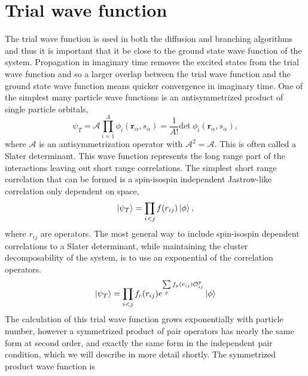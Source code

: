 \section{Trial wave function}
The trial wave function is used in both the diffusion and branching algorithms and thus it is important that it be close to the ground state wave function of the system. Propagation in imaginary time removes the excited states from the trial wave function and so a larger overlap between the trial wave function and the ground state wave function means quicker convergence in imaginary time. One of the simplest many particle wave functions is an antisymmetrized product of single particle orbitals,
\begin{equation}
   \psi_{T} = \mathcal{A} \prod\limits_{i=1}^A \phi_i(\mathbf{r}_\alpha,s_\alpha) = \frac{1}{A!} \mathrm{det}~\phi_i(\mathbf{r}_\alpha,s_\alpha),
\end{equation}
where $\mathcal{A}$ is an antisymmetrization operator with $\mathcal{A}^2=\mathcal{A}$. This is often called a Slater determinant. This wave function represents the long range part of the interactions leaving out short range correlations. The simplest short range correlation that can be formed is a spin-isospin independent Jastrow-like correlation only dependent on space,
\begin{equation}
   \left| \psi_T \right> = \prod\limits_{i<j}f(r_{ij}) \left| \phi \right>,
\end{equation}
where $r_{ij}$ are operators. %
The most general way to include spin-isospin dependent correlations to a Slater determinant, while maintaining the cluster decomposability of the system, is to use an exponential of the correlation operators.
\begin{equation}
   \left| \psi_T \right> = \prod\limits_{i<j}f_c(r_{ij}) e^{\sum\limits_pf_p(r_{ij})\mathcal{O}_{ij}^p} \left| \phi \right>
   \label{equ:exppsi}
\end{equation}
The calculation of this trial wave function grows exponentially with particle number, however a symmetrized product of pair operators has nearly the same form at second order, and exactly the same form in the independent pair condition, which we will describe in more detail shortly. The symmetrized product wave function is
